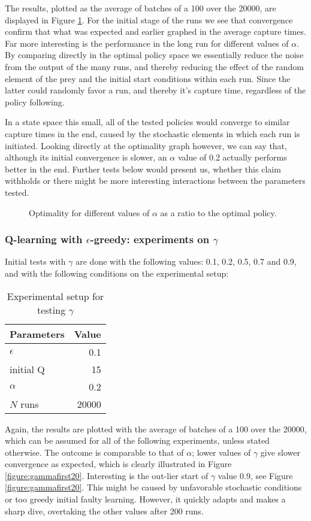 \documentclass[paper=a4, fontsize=11pt]{scrartcl}
\numberwithin{equation}{section}		%
\numberwithin{figure}{section}			%
\numberwithin{table}{section}				%
\begin{document}
The results, plotted as the average of batches of a 100 over the 20000, are displayed in Figure \ref{figure:alphaOpti}. For the initial stage of the runs we see that convergence confirm that what was expected and earlier graphed in the average capture times. Far more interesting is the performance in the long run for different values of $\alpha$. By comparing directly in the optimal policy space we essentially reduce the noise from the output of the many runs, and thereby reducing the effect of the random element of the prey and the initial start conditions within each run. Since the latter could randomly favor a run, and thereby it's capture time, regardless of the policy following. 

In a state space this small, all of the tested policies would converge to similar capture times in the end, caused by the stochastic elements in which each run is initiated. Looking directly at the optimality graph however, we can say that, although its initial convergence is slower, an $\alpha$ value of 0.2 actually performs better in the end. Further tests below would present us, whether this claim withholds or there might be more interesting interactions between the parameters tested.
\begin{figure}[H] \centering
\caption{Optimality for different values of $\alpha$ as a ratio to the optimal policy.} 
\label{figure:alphaOpti}
\end{figure}
\subsubsection*{Q-learning with $\epsilon$-greedy: experiments on $\gamma$}
Initial tests with $\gamma$ are done with the following values: 0.1, 0.2, 0.5, 0.7 and 0.9, and with the following conditions on the experimental setup:
\begin{table}[H]
\caption{Experimental setup for testing $\gamma$}
\centering
\begin{tabular}{|l|r|}
\hline
Parameters & Value \\\hline
$\epsilon$ & 0.1 \\\hline
initial Q & 15 \\\hline
$\alpha$ & 0.2\\\hline
$N$ runs & 20000\\\hline
\end{tabular}
\label{expSetupGamma}
\end{table}
Again, the results are plotted with the average of batches of a 100 over the 20000, which can be assumed for all of the following experiments, unless stated otherwise. The outcome is comparable to that of $\alpha$; lower values of $\gamma$ give slower convergence as expected, which is clearly illustrated in Figure \ref{figure:gammafirst20}. Interesting is the out-lier start of $\gamma$ value 0.9, see Figure \ref{figure:gammafirst20}. This might be caused by unfavorable stochastic conditions or too greedy initial faulty learning. However, it quickly adapts and makes a sharp dive, overtaking the other values after 200 runs.
\end{document}
